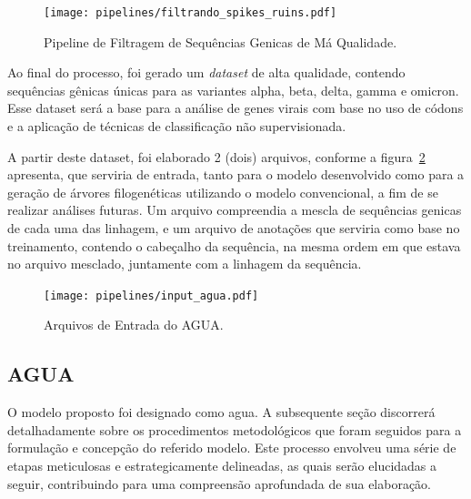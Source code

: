 \begin{enumerate}
        \begin{figure}[htb]
          \centering
          \caption{Pipeline de Filtragem de Sequências Genicas de Má Qualidade.}
          \texttt{[image: pipelines/filtrando\_spikes\_ruins.pdf]}
          ~\label{fig:spikesRuins}
        \end{figure}
\end{enumerate}

Ao final do processo, foi gerado um \textit{dataset} de alta qualidade, contendo sequências gênicas únicas para as variantes alpha, beta, delta, gamma e omicron. Esse dataset será a base para a análise de genes virais com base no uso de códons e a aplicação de técnicas de classificação não supervisionada.

A partir deste dataset, foi elaborado 2 (dois) arquivos, conforme a figura~\ref{fig:inputAgua} apresenta, que serviria de entrada, tanto para o modelo desenvolvido como para a geração de árvores filogenéticas utilizando o modelo convencional, a fim de se realizar análises futuras. Um arquivo compreendia a mescla de sequências genicas de cada uma das linhagem, e um arquivo de anotações que serviria como base no treinamento, contendo o cabeçalho da sequência, na mesma ordem em que estava no arquivo mesclado, juntamente com a linhagem da sequência.

\begin{figure}[htb]
  \centering
  \caption{Arquivos de Entrada do AGUA.}
  \texttt{[image: pipelines/input\_agua.pdf]}
  ~\label{fig:inputAgua}
\end{figure}

\subsection{AGUA}
O modelo proposto foi designado como \gls{agua}. A subsequente seção discorrerá detalhadamente sobre os procedimentos metodológicos que foram seguidos para a formulação e concepção do referido modelo. Este processo envolveu uma série de etapas meticulosas e estrategicamente delineadas, as quais serão elucidadas a seguir, contribuindo para uma compreensão aprofundada de sua elaboração.

